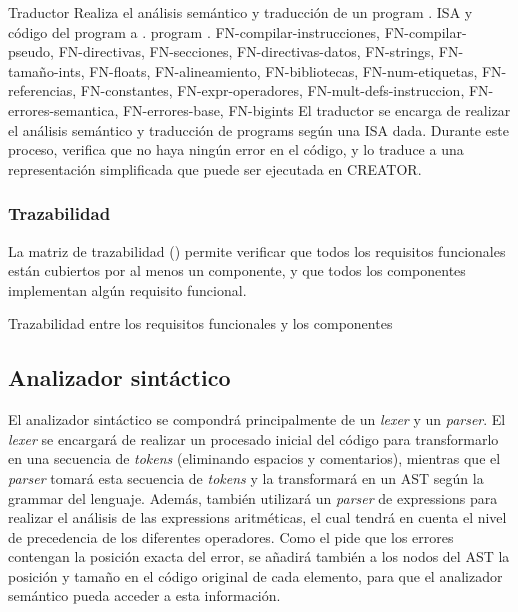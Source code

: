 \begin{component}{Traductor}
    {Realiza el análisis semántico y traducción de un \gls{program} .} %
    {\NA} %
    {\gls{ISA} y código del \gls{program} a .} %
    {\Gls{program} .} %
    {FN-compilar-instrucciones, FN-compilar-pseudo, FN-directivas,
    FN-secciones, FN-directivas-datos, FN-strings, FN-tamaño-ints,
    FN-floats, FN-alineamiento, FN-bibliotecas, FN-num-etiquetas,
    FN-referencias, FN-constantes, FN-expr-operadores,
    FN-mult-defs-instruccion, FN-errores-semantica, FN-errores-base, FN-bigints} %
    El traductor se encarga de realizar el análisis semántico y traducción
    de \glspl{program}  según una \gls{ISA} dada.
    Durante este proceso, verifica que no haya ningún error en el código, y lo
    traduce a una representación simplificada que puede ser ejecutada en
    CREATOR.
\end{component}

\let\componentref\undefined

\FloatBarrier

\subsubsection{Trazabilidad}

La matriz de trazabilidad () permite verificar que
todos los requisitos funcionales están cubiertos por al menos un componente, y
que todos los componentes implementan algún requisito funcional.

\begin{landscape}
        {Trazabilidad entre los requisitos funcionales y los componentes}
\end{landscape}

\FloatBarrier

\subsection{Analizador sintáctico}

El analizador sintáctico se compondrá principalmente de un \textit{\gls{lexer}}
y un \textit{\gls{parser}}. El \textit{\gls{lexer}} se encargará de realizar un
procesado inicial del código para transformarlo en una secuencia de
\textit{\glspl{token}} (eliminando espacios y comentarios), mientras que el
\textit{\gls{parser}} tomará esta secuencia de \textit{\glspl{token}} y la
transformará en un \gls{AST} según la \gls{grammar} del lenguaje. Además,
también utilizará un \textit{\gls{parser}} de \glspl{expression} para realizar
el análisis de las \glspl{expression} aritméticas, el cual tendrá en cuenta el
nivel de precedencia de los diferentes operadores. Como el
 pide que los errores contengan la posición exacta del
error, se añadirá también a los nodos del \gls{AST} la posición y tamaño en el
código original de cada elemento, para que el analizador semántico pueda acceder
a esta información.

